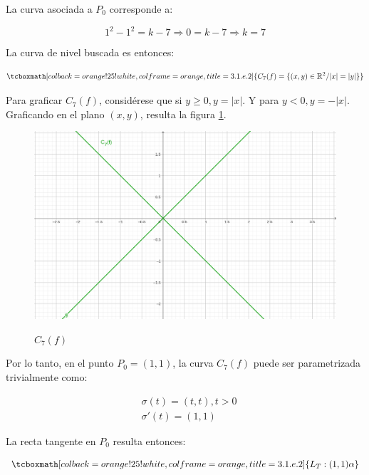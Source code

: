 \documentclass{article}
\renewcommand{\Bbb}{\mathbb}
\begin{document}
La curva asociada a $P_0$ corresponde a:

\begin{equation}
1^2 - 1^2 = k - 7 \Rightarrow 0 = k - 7 \Rightarrow k = 7
\end{equation}

La curva de nivel buscada es entonces:

\begin{equation}
\tcboxmath[colback=orange!25!white,colframe=orange,title=3.1.e.2]
{
C_{7}(f) = \{ (x,y) \in \Bbb R^2 / |x| = |y| \}
}
\end{equation}

Para graficar $C_7(f)$, considérese que si $y \ge 0, y = |x|$. Y para $y < 0, y = -|x|$. Graficando en el plano $(x,y)$, resulta la figura \ref{fig:1-e-2-1}.

\begin{figure}[ht]
\caption{$C_7(f)$}
\includegraphics[scale=1.25]{img/ejercicios/3/1-e-2-1.png} 
\centering
\label{fig:1-e-2-1}
\end{figure}

Por lo tanto, en el punto $P_0 = (1,1)$, la curva $C_7(f)$ puede ser parametrizada trivialmente como:


\begin{subequations}
\begin{align}
& \sigma(t) = (t, t), t > 0 \\
& \sigma'(t) = (1, 1)
\end{align}
\end{subequations}

La recta tangente en $P_0$ resulta entonces:

\begin{equation}
\tcboxmath[colback=orange!25!white,colframe=orange,title=3.1.e.2]
{
L_T: (1, 1) \alpha
}
\end{equation}
\end{document}
